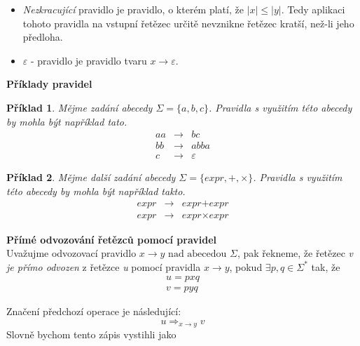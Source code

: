 \documentclass[10pt,a4paper]{article}
\theoremstyle{note}
\newtheorem{priklad}{Příklad}
\begin{document}
		\vspace{3mm}
\begin{itemize}
\item \textit{Nezkracující} pravidlo je pravidlo, o kterém platí, že $|x| \leq |y|$. Tedy aplikaci tohoto pravidla na vstupní řetězec určitě nevznikne řetězec kratší, než-li jeho předloha.

\item $\varepsilon$ - pravidlo je pravidlo tvaru $x \rightarrow \varepsilon$.
\end{itemize}


		\textbf{Příklady pravidel}\\

		\vspace{3mm}
\begin{priklad}
Mějme zadání abecedy $\Sigma = \lbrace a,b,c \rbrace$. Pravidla s využitím této abecedy by mohla být například tato.
\begin{eqnarray*}
aa &\rightarrow& bc \\
bb &\rightarrow& abba \\
c &\rightarrow& \varepsilon
\end{eqnarray*}
\end{priklad}

\begin{priklad}
Mějme další zadání abecedy $\Sigma = \lbrace expr, +, \times \rbrace$. Pravidla s využitím této abecedy by mohla být například takto.
\begin{eqnarray*}
\textit{expr} &\rightarrow& \textit{expr} + \textit{expr} \\
\textit{expr} &\rightarrow& \textit{expr} \times \textit{expr}
\end{eqnarray*}
\end{priklad}


		\textbf{Přímé odvozování řetězců pomocí pravidel}\\

		\vspace{3mm}
Uvažujme odvozovací pravidlo $ x \rightarrow y \text{ nad abecedou } \Sigma$, pak řekneme, že řetězec \textit{v} \textit{je přímo odvozen}
z řetězce \textit{u} pomocí pravidla $ x \rightarrow y $, pokud $\exists p, q \in \Sigma^{*}$ tak, že
\begin{gather*}
u = p x q \\
v = p y q
\end{gather*}

Značení předchozí operace je následující:
$$
u \Rightarrow_{x \rightarrow y} v
$$
Slovně bychom tento zápis vystihli jako 
\end{document}
